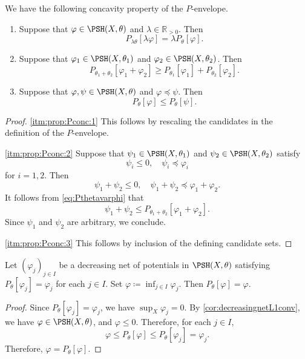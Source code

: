 We have the following concavity property of the $P$-envelope.
\begin{proposition}\label{prop:Pconc}
    \leavevmode
    \begin{enumerate}
        \item\label{itm:prop:Pconc:1} Suppose that $\varphi\in \PSH(X,\theta)$ and $\lambda\in \mathbb{R}_{>0}$. Then
            \[
                P_{\lambda\theta}[\lambda\varphi]=\lambda P_{\theta}[\varphi].
            \]
        \item\label{itm:prop:Pconc:2} Suppose that $\varphi_1\in \PSH(X,\theta_1)$ and $\varphi_2\in \PSH(X,\theta_2)$. Then
            \[
                P_{\theta_1+\theta_2}[\varphi_1+\varphi_2]\geq P_{\theta_1}[\varphi_1]+P_{\theta_2}[\varphi_2].
            \]
        \item\label{itm:prop:Pconc:3} Suppose that $\varphi,\psi\in \PSH(X,\theta)$ and $\varphi\preceq \psi$. Then
            \[
                P_{\theta}[\varphi]\leq P_{\theta}[\psi].
            \]
    \end{enumerate}
\end{proposition}
\begin{proof}
    \ref{itm:prop:Pconc:1} This follows by rescaling the candidates in the definition of the $P$-envelope.

    \ref{itm:prop:Pconc:2} Suppose that $\psi_1\in \PSH(X,\theta_1)$ and $\psi_2\in \PSH(X,\theta_2)$ satisfy
    \[
        \psi_i\leq 0,\quad \psi_i\preceq \varphi_i
    \]
    for $i=1,2$. Then
    \[
        \psi_1+\psi_2\leq 0,\quad \psi_1+\psi_2\preceq \varphi_1+\varphi_2.
    \]
    It follows from \eqref{eq:Pthetavarphi} that
    \[
        \psi_1+\psi_2\leq P_{\theta_1+\theta_2}[\varphi_1+\varphi_2].
    \]
    Since $\psi_1$ and $\psi_2$ are arbitrary, we conclude.

    \ref{itm:prop:Pconc:3} This follows by inclusion of the defining candidate sets.
\end{proof}











\begin{proposition}\label{prop:decseqmodel}
    Let $(\varphi_j)_{j\in I}$ be a decreasing net of potentials in $\PSH(X,\theta)$ satisfying $P_{\theta}[\varphi_j]=\varphi_j$ for each $j\in I$. Set $\varphi\coloneqq \inf_{j\in I} \varphi_j$. Then $P_{\theta}[\varphi]=\varphi$.
\end{proposition}
\begin{proof}
    Since $P_{\theta}[\varphi_j]=\varphi_j$, we have $\sup_X\varphi_j=0$. By \cref{cor:decreasingnetL1conv}, we have $\varphi\in \PSH(X,\theta)$, and $\varphi\leq 0$. Therefore, for each $j\in I$,
    \[
        \varphi\leq P_{\theta}[\varphi]\leq P_{\theta}[\varphi_j] =\varphi_j.
    \]
    Therefore, $\varphi=P_{\theta}[\varphi]$.
\end{proof}


